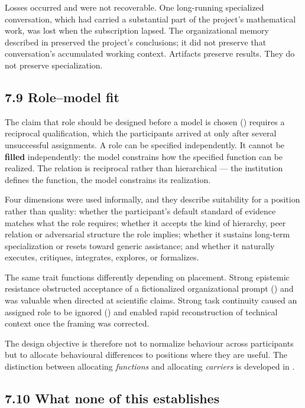 Losses occurred and were not recoverable. One long-running specialized conversation, which had carried a substantial part of the project's mathematical work, was lost when the subscription lapsed. The organizational memory described in  preserved the project's conclusions; it did not preserve that conversation's accumulated working context. Artifacts preserve results. They do not preserve specialization.


\subsection*{7.9 Role–model fit}
\label{sec:en:7.9}

The claim that role should be designed before a model is chosen () requires a reciprocal qualification, which the participants arrived at only after several unsuccessful assignments. A role can be specified independently. It cannot be \textbf{filled} independently: the model constrains how the specified function can be realized. The relation is reciprocal rather than hierarchical — the institution defines the function, the model constrains its realization.

Four dimensions were used informally, and they describe suitability for a position rather than quality: whether the participant's default standard of evidence matches what the role requires; whether it accepts the kind of hierarchy, peer relation or adversarial structure the role implies; whether it sustains long-term specialization or resets toward generic assistance; and whether it naturally executes, critiques, integrates, explores, or formalizes.

The same trait functions differently depending on placement. Strong epistemic resistance obstructed acceptance of a fictionalized organizational prompt () and was valuable when directed at scientific claims. Strong task continuity caused an assigned role to be ignored () and enabled rapid reconstruction of technical context once the framing was corrected.

The design objective is therefore not to normalize behaviour across participants but to allocate behavioural differences to positions where they are useful. The distinction between allocating \emph{functions} and allocating \emph{carriers} is developed in .


\subsection*{7.10 What none of this establishes}
\label{sec:en:7.10}

